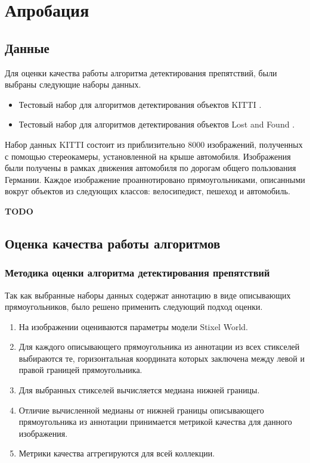 \documentclass[aps,%
14pt,%
final,%
oneside,
onecolumn,%
musixtex, %
superscriptaddress,%
centertags]{extarticle} %
\begin{document}
\newpage
\section{Апробация}

\subsection{Данные}

Для оценки качества работы алгоритма детектирования препятствий, были выбраны следующие наборы данных.
\begin{itemize}
\item Тестовый набор для алгоритмов детектирования объектов KITTI \cite{Geiger2012CVPR}.
\item Тестовый набор для алгоритмов детектирования объектов Lost and Found \cite{pinggera2016lost}.
\end{itemize}

Набор данных KITTI состоит из приблизительно 8000 изображений, полученных с помощью стереокамеры, установленной на крыше автомобиля. Изображения были получены в рамках движения автомобиля по дорогам общего пользования Германии. Каждое изображение проаннотировано прямоугольниками, описанными вокруг объектов из следующих классов: велосипедист, пешеход и автомобиль.

\textbf{\Large \color{Red} TODO}

\subsection{Оценка качества работы алгоритмов}

\subsubsection{Методика оценки алгоритма детектирования препятствий}

Так как выбранные наборы данных содержат аннотацию в виде описывающих прямоугольников, было решено применить следующий подход оценки. 
\begin{enumerate}
\item На изображении оцениваются параметры модели Stixel World.
\item Для каждого описывающего прямоугольника из аннотации из всех стикселей выбираются те, горизонтальная координата которых заключена между левой и правой границей прямоугольника.
\item Для выбранных стикселей вычисляется медиана нижней границы.
\item Отличие вычисленной медианы от нижней границы описывающего прямоугольника из аннотации принимается метрикой качества для данного изображения.
\item Метрики качества аггрегируются для всей коллекции.
\end{enumerate}
\end{document}
